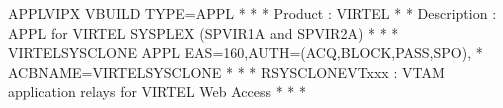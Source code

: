 \documentclass[letterpaper,10pt,english]{sphinxmanual}
\begin{document}
\begin{sphinxVerbatim}[commandchars=\\\{\}]
APPLVIPX VBUILD TYPE=APPL
* \PYGZhy{}\PYGZhy{}\PYGZhy{}\PYGZhy{}\PYGZhy{}\PYGZhy{}\PYGZhy{}\PYGZhy{}\PYGZhy{}\PYGZhy{}\PYGZhy{}\PYGZhy{}\PYGZhy{}\PYGZhy{}\PYGZhy{}\PYGZhy{}\PYGZhy{}\PYGZhy{}\PYGZhy{}\PYGZhy{}\PYGZhy{}\PYGZhy{}\PYGZhy{}\PYGZhy{}\PYGZhy{}\PYGZhy{}\PYGZhy{}\PYGZhy{}\PYGZhy{}\PYGZhy{}\PYGZhy{}\PYGZhy{}\PYGZhy{}\PYGZhy{}\PYGZhy{}\PYGZhy{}\PYGZhy{}\PYGZhy{}\PYGZhy{}\PYGZhy{}\PYGZhy{}\PYGZhy{}\PYGZhy{}\PYGZhy{}\PYGZhy{}\PYGZhy{}\PYGZhy{}\PYGZhy{}\PYGZhy{}\PYGZhy{}\PYGZhy{}\PYGZhy{}\PYGZhy{}\PYGZhy{}\PYGZhy{}\PYGZhy{}\PYGZhy{}\PYGZhy{}\PYGZhy{}\PYGZhy{}\PYGZhy{}\PYGZhy{}\PYGZhy{}\PYGZhy{}\PYGZhy{}\PYGZhy{} *
* Product : VIRTEL                                                   *
* Description : APPL for VIRTEL SYSPLEX (SPVIR1A and SPVIR2A)        *
* \PYGZhy{}\PYGZhy{}\PYGZhy{}\PYGZhy{}\PYGZhy{}\PYGZhy{}\PYGZhy{}\PYGZhy{}\PYGZhy{}\PYGZhy{}\PYGZhy{}\PYGZhy{}\PYGZhy{}\PYGZhy{}\PYGZhy{}\PYGZhy{}\PYGZhy{}\PYGZhy{}\PYGZhy{}\PYGZhy{}\PYGZhy{}\PYGZhy{}\PYGZhy{}\PYGZhy{}\PYGZhy{}\PYGZhy{}\PYGZhy{}\PYGZhy{}\PYGZhy{}\PYGZhy{}\PYGZhy{}\PYGZhy{}\PYGZhy{}\PYGZhy{}\PYGZhy{}\PYGZhy{}\PYGZhy{}\PYGZhy{}\PYGZhy{}\PYGZhy{}\PYGZhy{}\PYGZhy{}\PYGZhy{}\PYGZhy{}\PYGZhy{}\PYGZhy{}\PYGZhy{}\PYGZhy{}\PYGZhy{}\PYGZhy{}\PYGZhy{}\PYGZhy{}\PYGZhy{}\PYGZhy{}\PYGZhy{}\PYGZhy{}\PYGZhy{}\PYGZhy{}\PYGZhy{}\PYGZhy{}\PYGZhy{}\PYGZhy{}\PYGZhy{}\PYGZhy{}\PYGZhy{}\PYGZhy{} *
VIRTEL\PYGZam{}SYSCLONE APPL EAS=160,AUTH=(ACQ,BLOCK,PASS,SPO),               *
      ACBNAME=VIRTEL\PYGZam{}SYSCLONE
* \PYGZhy{}\PYGZhy{}\PYGZhy{}\PYGZhy{}\PYGZhy{}\PYGZhy{}\PYGZhy{}\PYGZhy{}\PYGZhy{}\PYGZhy{}\PYGZhy{}\PYGZhy{}\PYGZhy{}\PYGZhy{}\PYGZhy{}\PYGZhy{}\PYGZhy{}\PYGZhy{}\PYGZhy{}\PYGZhy{}\PYGZhy{}\PYGZhy{}\PYGZhy{}\PYGZhy{}\PYGZhy{}\PYGZhy{}\PYGZhy{}\PYGZhy{}\PYGZhy{}\PYGZhy{}\PYGZhy{}\PYGZhy{}\PYGZhy{}\PYGZhy{}\PYGZhy{}\PYGZhy{}\PYGZhy{}\PYGZhy{}\PYGZhy{}\PYGZhy{}\PYGZhy{}\PYGZhy{}\PYGZhy{}\PYGZhy{}\PYGZhy{}\PYGZhy{}\PYGZhy{}\PYGZhy{}\PYGZhy{}\PYGZhy{}\PYGZhy{}\PYGZhy{}\PYGZhy{}\PYGZhy{}\PYGZhy{}\PYGZhy{}\PYGZhy{}\PYGZhy{}\PYGZhy{}\PYGZhy{}\PYGZhy{}\PYGZhy{}\PYGZhy{}\PYGZhy{}\PYGZhy{}\PYGZhy{} *
* R\PYGZam{}SYSCLONEVTxxx : VTAM application relays for VIRTEL Web Access    *
* \PYGZhy{}\PYGZhy{}\PYGZhy{}\PYGZhy{}\PYGZhy{}\PYGZhy{}\PYGZhy{}\PYGZhy{}\PYGZhy{}\PYGZhy{}\PYGZhy{}\PYGZhy{}\PYGZhy{}\PYGZhy{}\PYGZhy{}\PYGZhy{}\PYGZhy{}\PYGZhy{}\PYGZhy{}\PYGZhy{}\PYGZhy{}\PYGZhy{}\PYGZhy{}\PYGZhy{}\PYGZhy{}\PYGZhy{}\PYGZhy{}\PYGZhy{}\PYGZhy{}\PYGZhy{}\PYGZhy{}\PYGZhy{}\PYGZhy{}\PYGZhy{}\PYGZhy{}\PYGZhy{}\PYGZhy{}\PYGZhy{}\PYGZhy{}\PYGZhy{}\PYGZhy{}\PYGZhy{}\PYGZhy{}\PYGZhy{}\PYGZhy{}\PYGZhy{}\PYGZhy{}\PYGZhy{}\PYGZhy{}\PYGZhy{}\PYGZhy{}\PYGZhy{}\PYGZhy{}\PYGZhy{}\PYGZhy{}\PYGZhy{}\PYGZhy{}\PYGZhy{}\PYGZhy{}\PYGZhy{}\PYGZhy{}\PYGZhy{}\PYGZhy{}\PYGZhy{}\PYGZhy{}\PYGZhy{} *

\end{sphinxVerbatim}
\end{document}
